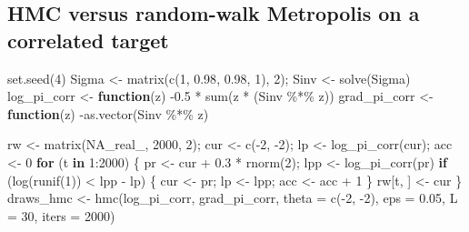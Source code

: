 \documentclass[
  letterpaper,
  DIV=11,
  numbers=noendperiod]{scrreprt}
\newenvironment{Shaded}{\begin{snugshade}}{\end{snugshade}}
\newcommand{\AttributeTok}[1]{\textcolor[rgb]{0.40,0.45,0.13}{#1}}
\newcommand{\ConstantTok}[1]{\textcolor[rgb]{0.56,0.35,0.01}{#1}}
\newcommand{\ControlFlowTok}[1]{\textcolor[rgb]{0.00,0.23,0.31}{\textbf{#1}}}
\newcommand{\DecValTok}[1]{\textcolor[rgb]{0.68,0.00,0.00}{#1}}
\newcommand{\FloatTok}[1]{\textcolor[rgb]{0.68,0.00,0.00}{#1}}
\newcommand{\FunctionTok}[1]{\textcolor[rgb]{0.28,0.35,0.67}{#1}}
\newcommand{\NormalTok}[1]{\textcolor[rgb]{0.00,0.23,0.31}{#1}}
\newcommand{\OtherTok}[1]{\textcolor[rgb]{0.00,0.23,0.31}{#1}}
\newcommand{\SpecialCharTok}[1]{\textcolor[rgb]{0.37,0.37,0.37}{#1}}
\begin{document}
\subsection{HMC versus random-walk Metropolis on a correlated
target}\label{hmc-versus-random-walk-metropolis-on-a-correlated-target}

\begin{Shaded}
\begin{Highlighting}[]
\FunctionTok{set.seed}\NormalTok{(}\DecValTok{4}\NormalTok{)}
\NormalTok{Sigma }\OtherTok{\textless{}{-}} \FunctionTok{matrix}\NormalTok{(}\FunctionTok{c}\NormalTok{(}\DecValTok{1}\NormalTok{, }\FloatTok{0.98}\NormalTok{, }\FloatTok{0.98}\NormalTok{, }\DecValTok{1}\NormalTok{), }\DecValTok{2}\NormalTok{); Sinv }\OtherTok{\textless{}{-}} \FunctionTok{solve}\NormalTok{(Sigma)}
\NormalTok{log\_pi\_corr  }\OtherTok{\textless{}{-}} \ControlFlowTok{function}\NormalTok{(z) }\SpecialCharTok{{-}}\FloatTok{0.5} \SpecialCharTok{*} \FunctionTok{sum}\NormalTok{(z }\SpecialCharTok{*}\NormalTok{ (Sinv }\SpecialCharTok{\%*\%}\NormalTok{ z))}
\NormalTok{grad\_pi\_corr }\OtherTok{\textless{}{-}} \ControlFlowTok{function}\NormalTok{(z) }\SpecialCharTok{{-}}\FunctionTok{as.vector}\NormalTok{(Sinv }\SpecialCharTok{\%*\%}\NormalTok{ z)}

\NormalTok{rw }\OtherTok{\textless{}{-}} \FunctionTok{matrix}\NormalTok{(}\ConstantTok{NA\_real\_}\NormalTok{, }\DecValTok{2000}\NormalTok{, }\DecValTok{2}\NormalTok{); cur }\OtherTok{\textless{}{-}} \FunctionTok{c}\NormalTok{(}\SpecialCharTok{{-}}\DecValTok{2}\NormalTok{, }\SpecialCharTok{{-}}\DecValTok{2}\NormalTok{); lp }\OtherTok{\textless{}{-}} \FunctionTok{log\_pi\_corr}\NormalTok{(cur); acc }\OtherTok{\textless{}{-}} \DecValTok{0}
\ControlFlowTok{for}\NormalTok{ (t }\ControlFlowTok{in} \DecValTok{1}\SpecialCharTok{:}\DecValTok{2000}\NormalTok{) \{}
\NormalTok{    pr }\OtherTok{\textless{}{-}}\NormalTok{ cur }\SpecialCharTok{+} \FloatTok{0.3} \SpecialCharTok{*} \FunctionTok{rnorm}\NormalTok{(}\DecValTok{2}\NormalTok{); lpp }\OtherTok{\textless{}{-}} \FunctionTok{log\_pi\_corr}\NormalTok{(pr)}
    \ControlFlowTok{if}\NormalTok{ (}\FunctionTok{log}\NormalTok{(}\FunctionTok{runif}\NormalTok{(}\DecValTok{1}\NormalTok{)) }\SpecialCharTok{\textless{}}\NormalTok{ lpp }\SpecialCharTok{{-}}\NormalTok{ lp) \{ cur }\OtherTok{\textless{}{-}}\NormalTok{ pr; lp }\OtherTok{\textless{}{-}}\NormalTok{ lpp; acc }\OtherTok{\textless{}{-}}\NormalTok{ acc }\SpecialCharTok{+} \DecValTok{1}\NormalTok{ \}}
\NormalTok{    rw[t, ] }\OtherTok{\textless{}{-}}\NormalTok{ cur}
\NormalTok{\}}
\NormalTok{draws\_hmc }\OtherTok{\textless{}{-}} \FunctionTok{hmc}\NormalTok{(log\_pi\_corr, grad\_pi\_corr, }\AttributeTok{theta =} \FunctionTok{c}\NormalTok{(}\SpecialCharTok{{-}}\DecValTok{2}\NormalTok{, }\SpecialCharTok{{-}}\DecValTok{2}\NormalTok{), }\AttributeTok{eps =} \FloatTok{0.05}\NormalTok{, }\AttributeTok{L =} \DecValTok{30}\NormalTok{, }\AttributeTok{iters =} \DecValTok{2000}\NormalTok{)}


\end{Highlighting}
\end{Shaded}
\end{document}
